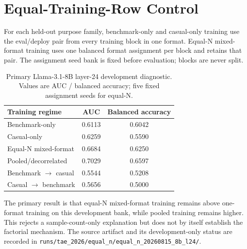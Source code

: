 \section{Equal-Training-Row Control}
For each held-out purpose family, benchmark-only and casual-only training use the eval/deploy pair from every training block in one format. Equal-N mixed-format training uses one balanced format assignment per block and retains that pair. The assignment seed bank is fixed before evaluation; blocks are never split.

\begin{table}[t]
\centering
\caption{Primary Llama-3.1-8B layer-24 development diagnostic. Values are AUC / balanced accuracy; five fixed assignment seeds for equal-N.}
\begin{tabular}{lcc}\toprule
Training regime & AUC & Balanced accuracy\\\midrule
Benchmark-only & 0.6113 & 0.6042\\
Casual-only & 0.6259 & 0.5590\\
Equal-N mixed-format & 0.6684 & 0.6250\\
Pooled/decorrelated & 0.7029 & 0.6597\\
Benchmark $\rightarrow$ casual & 0.5544 & 0.5208\\
Casual $\rightarrow$ benchmark & 0.5656 & 0.5000\\\bottomrule
\end{tabular}
\end{table}

The primary result is that equal-N mixed-format training remains above one-format training on this development bank, while pooled training remains higher. This rejects a sample-count-only explanation but does not by itself establish the factorial mechanism. The source artifact and its development-only status are recorded in \texttt{runs/tae\_2026/equal\_n/equal\_n\_20260815\_8b\_l24/}.
